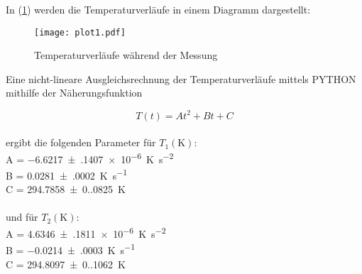 

In (\ref{fig:plot1}) werden die Temperaturverläufe in einem Diagramm dargestellt:

\begin{figure}
  \centering
  \texttt{[image: plot1.pdf]}
  \caption{Temperaturverläufe während der Messung}
  \label{fig:plot1}
\end{figure}

Eine nicht-lineare Ausgleichsrechnung der Temperaturverläufe mittels PYTHON mithilfe der Näherungsfunktion

\begin{equation*} 
  T(t) = At^2 + Bt + C 
\end{equation*}
\\
ergibt die folgenden Parameter für $T_{1} (\unit{\kelvin})$: \\
A = \qty{-6.6217(1407)e-6}{\unit[per-mode=reciprocal]{\kelvin\per\second\squared}} \\
B = \qty{0.0281(0002)}{\unit[per-mode=reciprocal]{\kelvin\per\second}} \\
C = \qty{294.7858(0.0825)}{\unit\kelvin} \\
\\
und für $T_{2} (\unit{\kelvin})$: \\
A = \qty{4.6346(1811)e-6}{\unit[per-mode=reciprocal]{\kelvin\per\second\squared}} \\
B = \qty{-0.0214(0003)}{\unit[per-mode=reciprocal]{\kelvin\per\second}} \\
C = \qty{294.8097(0.1062)}{\unit\kelvin} \\

